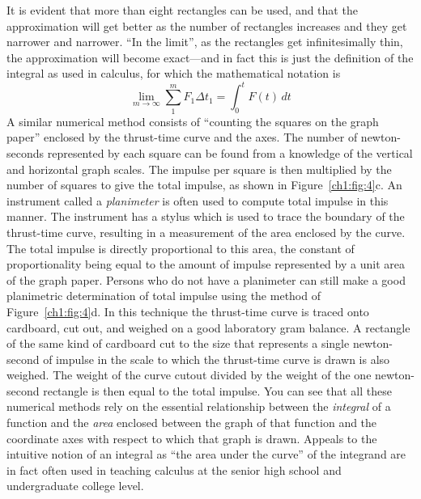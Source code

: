 It is evident that more than eight rectangles can be used, and that the approximation will get
better as the number of rectangles increases and they get narrower and narrower. ``In the
limit'', as the rectangles get infinitesimally thin, the approximation will become exact---and in
fact this is just the definition of the integral as used in calculus, for which the mathematical
notation is
\begin{equation*}
\lim_{m\to\infty} \sum_{1}^{m} F_1\Delta t_1 = \int_{0}^{t} F(t)\,dt
\end{equation*}
A similar numerical method consists of ``counting the squares on the graph paper'' enclosed by
the thrust-time curve and the axes. The number of newton-seconds represented by each square can
be found from a knowledge of the vertical and horizontal graph scales. The impulse per square is
then multiplied by the number of squares to give the total impulse, as shown in
Figure~\ref{ch1:fig:4}c. An instrument called a \emph{planimeter} is often used to compute total
impulse in this manner. The instrument has a stylus which is used to trace the boundary of the
thrust-time curve, resulting in a measurement of the area enclosed by the curve. The total
impulse is directly proportional to this area, the constant of proportionality being equal to the
amount of impulse represented by a unit area of the graph paper. Persons who do not have a
planimeter can still make a good planimetric determination of total impulse using the method of
Figure~\ref{ch1:fig:4}d. In this technique the thrust-time curve is traced onto cardboard, cut
out, and weighed on a good laboratory gram balance. A rectangle of the same kind of cardboard cut
to the size that represents a single newton-second of impulse in the scale to which the
thrust-time curve is drawn is also weighed. The weight of the curve cutout divided by the weight
of the one newton-second rectangle is then equal to the total impulse. You can see that all these
numerical methods rely on the essential relationship between the \emph{integral} of a function
and the \emph{area} enclosed between the graph of that function and the coordinate axes with
respect to which that graph is drawn. Appeals to the intuitive notion of an integral as ``the
area under the curve'' of the integrand are in fact often used in teaching calculus at the senior
high school and undergraduate college level.

